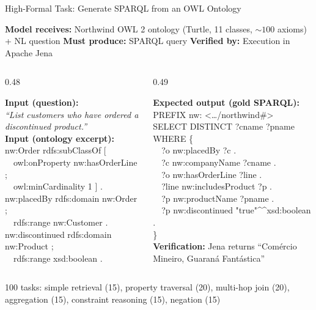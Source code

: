 \documentclass[aspectratio=169]{beamer}
\begin{document}
\begin{frame}{High-Formal Task: Generate SPARQL from an OWL Ontology}

{\small
\textbf{Model receives:} Northwind OWL 2 ontology (Turtle, 11 classes, ${\sim}100$ axioms) + NL question \quad
\textbf{Must produce:} SPARQL query \quad
\textbf{Verified by:} Execution in Apache Jena}

\vspace{0.3em}
\begin{columns}[T]
\begin{column}{0.48\textwidth}
\colorbox{highformal!8}{\parbox{0.95\linewidth}{\footnotesize
\textbf{Input (question):}\\[0.2em]
\textit{``List customers who have ordered a discontinued product.''}\\[0.4em]
\textbf{Input (ontology excerpt):}\\[0.2em]
{\scriptsize\ttfamily
nw:Order rdfs:subClassOf [\\
~~owl:onProperty nw:hasOrderLine ;\\
~~owl:minCardinality 1 ] .\\
nw:placedBy rdfs:domain nw:Order ;\\
~~rdfs:range nw:Customer .\\
nw:discontinued rdfs:domain nw:Product ;\\
~~rdfs:range xsd:boolean .
}}}
\end{column}

\begin{column}{0.49\textwidth}
\colorbox{highformal!8}{\parbox{0.95\linewidth}{\footnotesize
\textbf{Expected output (gold SPARQL):}\\[0.2em]
{\scriptsize\ttfamily
PREFIX nw: <\ldots/northwind\#>\\
SELECT DISTINCT ?cname ?pname\\
WHERE \{\\
~~?o nw:placedBy ?c .\\
~~?c nw:companyName ?cname .\\
~~?o nw:hasOrderLine ?line .\\
~~?line nw:includesProduct ?p .\\
~~?p nw:productName ?pname .\\
~~?p nw:discontinued "true"\^{}\^{}xsd:boolean .\\
\}
}\\[0.3em]
\textbf{Verification:} Jena returns ``Com\'{e}rcio Mineiro, Guaran\'{a} Fant\'{a}stica''
}}
\end{column}
\end{columns}

\vspace{0.4em}
{\footnotesize 100 tasks: simple retrieval (15), property traversal (20), multi-hop join (20), aggregation (15), constraint reasoning (15), negation (15)}

\end{frame}
\end{document}
